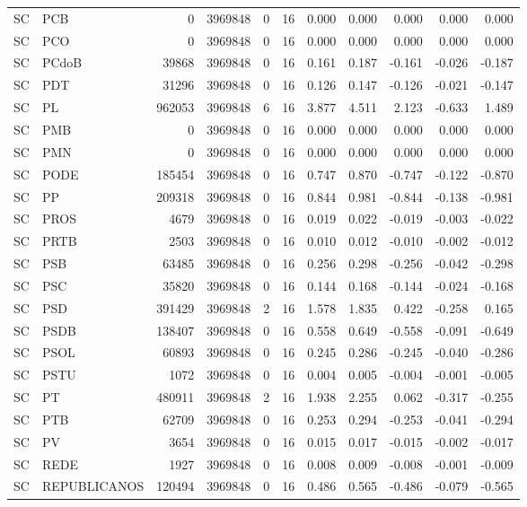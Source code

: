 \begin{landscape}
\begin{longtable}{llrrrrrrrrr}
SC & PCB & 0 & 3969848 & 0 & 16 & 0.000 & 0.000 & 0.000 & 0.000 & 0.000 \\
SC & PCO & 0 & 3969848 & 0 & 16 & 0.000 & 0.000 & 0.000 & 0.000 & 0.000 \\
SC & PCdoB & 39868 & 3969848 & 0 & 16 & 0.161 & 0.187 & -0.161 & -0.026 & -0.187 \\
SC & PDT & 31296 & 3969848 & 0 & 16 & 0.126 & 0.147 & -0.126 & -0.021 & -0.147 \\
SC & PL & 962053 & 3969848 & 6 & 16 & 3.877 & 4.511 & 2.123 & -0.633 & 1.489 \\
SC & PMB & 0 & 3969848 & 0 & 16 & 0.000 & 0.000 & 0.000 & 0.000 & 0.000 \\
SC & PMN & 0 & 3969848 & 0 & 16 & 0.000 & 0.000 & 0.000 & 0.000 & 0.000 \\
SC & PODE & 185454 & 3969848 & 0 & 16 & 0.747 & 0.870 & -0.747 & -0.122 & -0.870 \\
SC & PP & 209318 & 3969848 & 0 & 16 & 0.844 & 0.981 & -0.844 & -0.138 & -0.981 \\
SC & PROS & 4679 & 3969848 & 0 & 16 & 0.019 & 0.022 & -0.019 & -0.003 & -0.022 \\
SC & PRTB & 2503 & 3969848 & 0 & 16 & 0.010 & 0.012 & -0.010 & -0.002 & -0.012 \\
SC & PSB & 63485 & 3969848 & 0 & 16 & 0.256 & 0.298 & -0.256 & -0.042 & -0.298 \\
SC & PSC & 35820 & 3969848 & 0 & 16 & 0.144 & 0.168 & -0.144 & -0.024 & -0.168 \\
SC & PSD & 391429 & 3969848 & 2 & 16 & 1.578 & 1.835 & 0.422 & -0.258 & 0.165 \\
SC & PSDB & 138407 & 3969848 & 0 & 16 & 0.558 & 0.649 & -0.558 & -0.091 & -0.649 \\
SC & PSOL & 60893 & 3969848 & 0 & 16 & 0.245 & 0.286 & -0.245 & -0.040 & -0.286 \\
SC & PSTU & 1072 & 3969848 & 0 & 16 & 0.004 & 0.005 & -0.004 & -0.001 & -0.005 \\
SC & PT & 480911 & 3969848 & 2 & 16 & 1.938 & 2.255 & 0.062 & -0.317 & -0.255 \\
SC & PTB & 62709 & 3969848 & 0 & 16 & 0.253 & 0.294 & -0.253 & -0.041 & -0.294 \\
SC & PV & 3654 & 3969848 & 0 & 16 & 0.015 & 0.017 & -0.015 & -0.002 & -0.017 \\
SC & REDE & 1927 & 3969848 & 0 & 16 & 0.008 & 0.009 & -0.008 & -0.001 & -0.009 \\
SC & REPUBLICANOS & 120494 & 3969848 & 0 & 16 & 0.486 & 0.565 & -0.486 & -0.079 & -0.565 \\

\end{longtable}
\end{landscape}
